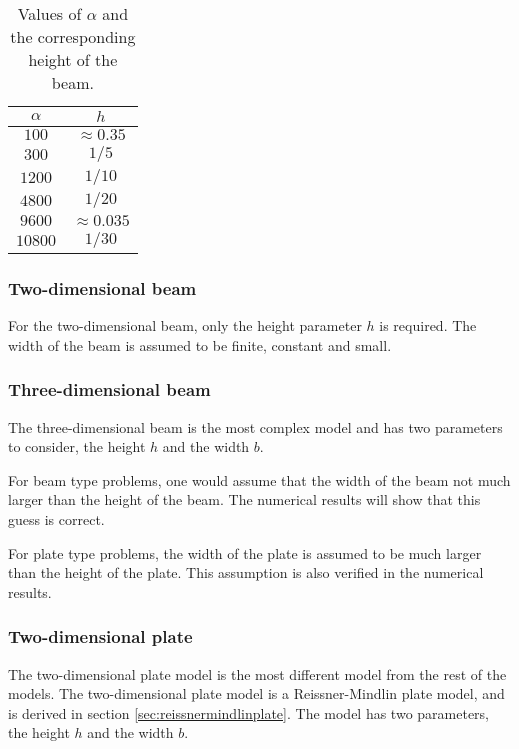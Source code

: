 \documentclass[../../main.tex]{subfiles}
\begin{document}
\begin{table}[h]
	\centering
	\begin{tabular}{|c|c|}
		\hline
		$\alpha$ & $h$\\
		\hline
		$100$ & $\approx 0.35$ \\
		$300$ & $1/5$ \\
		$1200$ & $1/10$ \\
		$4800$ & $1/20$ \\
		$9600$ & $\approx 0.035$ \\
		$10800$ & $1/30$ \\
		\hline
	\end{tabular}
	\caption{Values of $\alpha$ and the corresponding height of the beam.}
	\label{tab:alphaheight}
\end{table}

\subsubsection{Two-dimensional beam}

For the two-dimensional beam, only the height parameter $h$ is required. The width of the beam is assumed to be finite, constant and small. 

\subsubsection{Three-dimensional beam}
The three-dimensional beam is the most complex model and has two parameters to consider, the height $h$ and the width $b$.

For beam type problems, one would assume that the width of the beam not much larger than the height of the beam. The numerical results will show that this guess is correct.

For plate type problems, the width of the plate is assumed to be much larger than the height of the plate. This assumption is also verified in the numerical results.

\subsubsection{Two-dimensional plate}
The two-dimensional plate model is the most different model from the rest of the models. The two-dimensional plate model is a Reissner-Mindlin plate model, and is derived in section \ref{sec:reissnermindlinplate}. The model has two parameters, the height $h$ and the width $b$.

\end{document}

